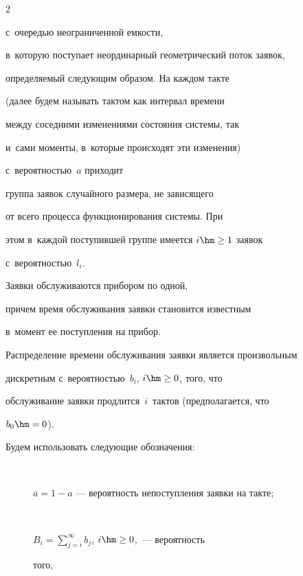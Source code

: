 \begin{multicols}{2}


с~очередью неограни\-чен\-ной емкости,


в~которую поступает неординарный геометрический поток заявок,


определяемый следующим образом. На каждом такте


(далее будем называть тактом как интервал времени


между соседними изменениями состояния сис\-те\-мы, так


и~сами моменты, в~которые происходят эти изменения)


с~вероятностью~$a$ приходит


группа заявок случайного размера, не зависящего


от всего процесса функционирования сис\-те\-мы. При


этом в~каждой поступившей группе имеется $i\hm\ge 1$ заявок 


с~вероятностью~$l_i$. 


Заявки обслуживаются прибором по одной,


причем время обслуживания заявки становится известным


в~момент ее поступления на прибор.


Распределение времени обслуживания заявки является произвольным


дискретным с~вероятностью~$b_i$, $i\hm\ge0$, того, что


обслуживание заявки продлится~$i$~так\-тов (предполагается, что


$b_0\hm=0$).










Будем использовать следующие обозначения:


\begin{description}


\item[\,]


$\overline{a}=1-a$ --- вероятность непоступления заявки на такте;


\item[\,]


$B_i= \sum\nolimits_{j=i}^\infty b_j$, $i \hm\ge 0$,~--- вероятность 


того,



\end{description}
\end{multicols}
